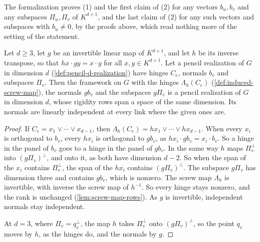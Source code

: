 \begin{fmlnote}
  The formalization proves (1) and the first claim of (2) for any
  vectors $b_u, b_v$ and any subspaces $\Pi_u, \Pi_v$ of $K^{d+1}$, and
  the last claim of (2) for any such vectors and subspaces with
  $b_u \neq 0$, by the proofs above, which read nothing more of the
  setting of the statement.
\end{fmlnote}

\begin{lemma}
  \label{lem:pencil-d-projective-transport}
  \leanok
  Let $d \ge 3$, let $g$ be an invertible linear map of $K^{d+1}$, and
  let $h$ be its inverse transpose, so that $h x \cdot g y = x \cdot y$
  for all $x, y \in K^{d+1}$. Let a pencil realization of $G$ in
  dimension $d$ (\cref{def:pencil-d-realization}) have hinges $C_e$,
  normals $b_v$ and subspaces $\Pi_v$. Then the framework on $G$ with the
  hinges $\Lambda_h(C_e)$ (\cref{def:induced-screw-map}), the normals
  $g b_v$ and the subspaces $g\Pi_v$ is a pencil realization of $G$ in
  dimension $d$, whose rigidity rows span a space of the same dimension.
  Its normals are linearly independent at every link where the given
  ones are.
\end{lemma}
\begin{proof}
  \leanok
  If $C_e = x_1 \vee \cdots \vee x_{d-1}$, then
  $\Lambda_h(C_e) = h x_1 \vee \cdots \vee h x_{d-1}$. When every $x_i$
  is orthogonal to $b_v$, every $h x_i$ is orthogonal to $g b_v$, as
  $h x_i \cdot g b_v = x_i \cdot b_v$. So a hinge in the panel of $b_v$
  goes to a hinge in the panel of $g b_v$. In the same way $h$ maps
  $\Pi_v^{\perp}$ into $(g\Pi_v)^{\perp}$, and onto it, as both have
  dimension $d - 2$. So when the span of the $x_i$ contains
  $\Pi_v^{\perp}$, the span of the $h x_i$ contains $(g\Pi_v)^{\perp}$.
  The subspace $g\Pi_v$ has dimension three and contains $g b_v$, which
  is nonzero. The screw map $\Lambda_h$ is invertible, with inverse the
  screw map of $h^{-1}$. So every hinge stays nonzero, and the rank is
  unchanged (\cref{lem:screw-map-rows}). As $g$ is invertible,
  independent normals stay independent.

  At $d = 3$, where $\Pi_v = q_v^{\perp}$, the map $h$ takes
  $\Pi_v^{\perp}$ onto $(g\Pi_v)^{\perp}$, so the point $q_v$ moves by
  $h$, as the hinges do, and the normals by $g$.
\end{proof}

